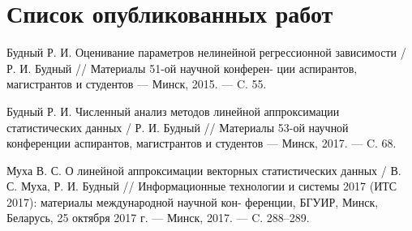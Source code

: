 \section{Список опубликованных работ}

\noindent [1"---A.] Будный Р. И.
Оценивание параметров нелинейной регрессионной
\hspace*{16.5mm} зависимости / Р. И. Будный // Материалы 51-ой научной конферен-
\hspace*{17mm} ции аспирантов, магистрантов и студентов --- Минск, 2015. --- C. 55.

\noindent [2"---A.] Будный Р. И.
Численный анализ методов линейной аппроксимации
\hspace*{15.5mm} статистических данных / Р. И. Будный // Материалы 53-ой научной
\hspace*{16mm} конференции аспирантов, магистрантов и студентов --- Минск, 2017.
\hspace*{16.5mm} --- C. 68.

\noindent [3"---A.] Муха В. С.
О линейной аппроксимации векторных статистических
\hspace*{15.5mm} данных / В. С. Муха, Р. И. Будный // Информационные технологии
\hspace*{16.5mm} и системы 2017 (ИТС 2017): материалы международной научной кон-
\hspace*{15.5mm} ференции, БГУИР, Минск, Беларусь, 25 октября 2017 г. --- Минск,
\hspace*{16.5mm} 2017. --- C. 288--289.
